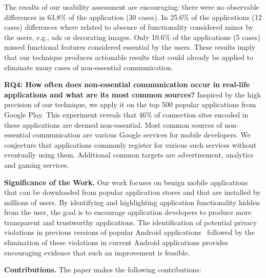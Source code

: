 The results of our usability assessment are encouraging: there were no observable differences in 63.8\% of the application (30 cases). In 25.6\% of the applications (12 cases) differences where related to absence of functionality considered minor by the users, e.g., ads or decorating images. Only 10.6\% of the applications (5 cases) missed functional features considered essential by the users. 
These results imply that our technique produces actionable results that could already be applied to eliminate many cases of non-essential communication. 


\noindent 
{\bf RQ4: How often does non-essential communication occur in real-life applications and what are its most common sources?}
Inspired by the high precision of our technique, we apply it on the top 500 popular applications from Google Play. This experiment reveals that 46\% of connection sites encoded in these applications 
are deemed non-essential.
Most common sources of non-essential communication are various Google services for mobile developers. We conjecture 
that applications commonly register for various such services without eventually using them. 
Additional common targets are advertisement, analytics and gaming services. 

\noindent 
{\bf Significance of the Work.}  Our work focuses on benign mobile
applications that can be downloaded from popular application stores
and that are installed by millions of users.  By identifying and
highlighting application functionality hidden from the user, the goal
is to encourage application developers to produce more transparent and
trustworthy applications. The identification of potential privacy
violations in previous versions of popular Android
applications~\cite{Enck:Gilbert:Chun:Cox:Jung:McDaniel:Sheth:OSDI10,Egele:Kruegel:Kirda:Vign:NDSS11,Tripp:Rubin:SEC14} followed by the
elimination of these violations in current Android applications
provides encouraging evidence that such an improvement is feasible.

\noindent 
{\bf Contributions.}
The paper makes the following contributions:

